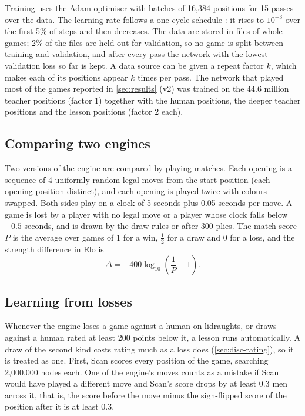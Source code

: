 Training uses the Adam optimiser \parencite{kingma2015} with batches of 16{,}384
positions for 15 passes over the data. The learning rate follows a one-cycle
schedule \parencite{smith2019}: it rises to $10^{-3}$ over the first 5\% of steps
and then decreases. The data are stored in files of whole games; 2\% of the files
are held out for validation, so no game is split between training and
validation, and after every pass the network with the lowest validation loss so
far is kept. A data source can be given a repeat factor $k$, which makes each of
its positions appear $k$ times per pass. The network that played most of the
games reported in \cref{sec:results} (v2) was trained on the 44.6 million teacher positions (factor 1) together with the human
positions, the deeper teacher positions and the lesson positions (factor 2 each).

\subsection{Comparing two engines}\label{sec:arena}

Two versions of the engine are compared by playing matches. Each opening is a
sequence of 4 uniformly random legal moves from the start position (each opening
position distinct), and each opening is played twice with colours swapped. Both
sides play on a clock of 5 seconds plus 0.05 seconds per move. A game is lost by
a player with no legal move or a player whose clock falls below $-0.5$ seconds,
and is drawn by the draw rules or after 300 plies. The match score $P$ is the
average over games of 1 for a win, $\tfrac12$ for a draw and 0 for a loss, and the
strength difference in Elo is
\begin{equation}\label{eq:elo}
  \Delta = -400 \log_{10}\!\left(\frac{1}{P} - 1\right).
\end{equation}

\subsection{Learning from losses}\label{sec:learning}

Whenever the engine loses a game against a human on lidraughts, or draws against
a human rated at least 200 points below it, a lesson runs automatically. A draw
of the second kind costs rating much as a loss does
(\cref{sec:disc-rating}), so it is treated as one. First, Scan scores every position of the game, searching
2{,}000{,}000 nodes each. One of the engine's moves counts as a mistake if Scan
would have played a different move and Scan's score drops by at least 0.3 men
across it, that is, the score before the move minus the sign-flipped score of the
position after it is at least 0.3.

